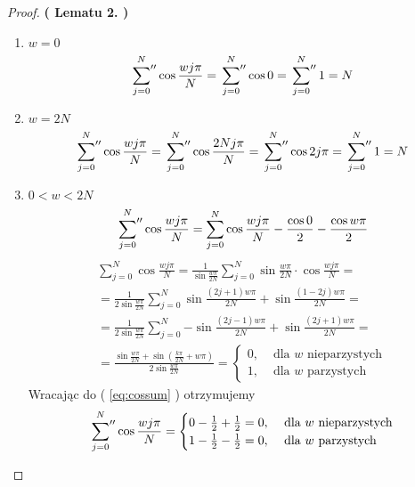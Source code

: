\documentclass{article}
\newcommand{\sumbis}[3] {
	\sideset{}{''}\sum_{#1}^{#2} #3
}
\begin{document}
\begin{proof} 
		\textbf{ ( Lematu 2. )} 
		~
		\begin{enumerate}
			\item $ w = 0 $ 
				\begin{equation} 
					\sumbis{j=0}{N}{ \cos{ \frac{ w j \pi}{N} } } = \sumbis{j=0}{N}{ \cos{0}} = 								\sumbis{j=0}{N}{ 1 } = N
				\end{equation}
			\item $ w = 2N $
				\begin{equation}
					\sumbis{j=0}{N}{ \cos{ \frac{ w j \pi}{N} } } = 
					\sumbis{j=0}{N}{ \cos{ \frac{ 2N j \pi}{N} } } = 
					\sumbis{j=0}{N}{ \cos{ 2j \pi } } = \sumbis{j=0}{N}{ 1 } = N
				\end{equation}
			\item $ 0 < w < 2N $
				\begin{equation}
					\label{eq:cossum}
					\sumbis{j=0}{N}{ \cos{ \frac{ w j \pi}{N} } } = 
					\sum_{j=0}^{N}{ \cos{ \frac{ w j \pi}{N} } }  - \frac{ \cos{0} }{2} - \frac{ \cos{ w 						\pi}}{2}					
				\end{equation}
				\begin{gather*}
					\sum_{j=0}^{N}{ \cos{ \frac{ w j \pi}{N} } } =
					\frac{1}{ \sin{ \frac{ w \pi }{2N} } } \sum_{j=0}^{N}{ \sin{ \frac{ w \pi }{2N} } \cdot
					\cos{ \frac{ w j \pi}{N} } } = \\
					= \frac{1}{ 2 \sin{ \frac{ w \pi }{2N} } } 
					\sum_{j=0}^{N}{ \sin{ \frac{(2j +1)w \pi}{2N} } + \sin{ \frac{(1 - 2j)w \pi}{2N}}} = \\
					= \frac{1}{ 2 \sin{ \frac{ w \pi }{2N} } }
					\sum_{j=0}^{N}{ - \sin{ \frac{(2j -1)w \pi}{2N}} + \sin{ \frac{(2j +1)w \pi}{2N} }} =\\
					= \frac{ \sin{ \frac{w \pi}{2N} } +\sin{ ( \frac{k \pi}{2N} +w \pi) }}{  2 \sin{ \frac{ w \pi }{2N} } } = 
					\begin{cases}
						0, & \text{ dla $w$ nieparzystych}\\
						1, & \text{ dla $w$ parzystych}
					\end{cases}
				\end{gather*}
				Wracając do ( \ref{eq:cossum} ) otrzymujemy 
					$$ \sumbis{j=0}{N}{ \cos{ \frac{ w j \pi}{N} } } = 
					\begin{cases}
						0 - \frac{1}{2} + \frac{1}{2} = 0, & \text{ dla $w$ nieparzystych}\\
						1 - \frac{1}{2} - \frac{1}{2} = 0, & \text{ dla $w$ parzystych}
					\end{cases}
					$$
		\end{enumerate}
\end{proof} 
\end{document}
